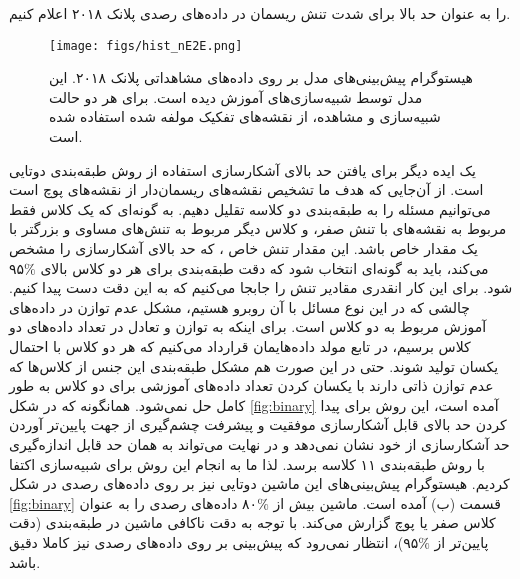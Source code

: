     را به عنوان حد بالا برای شدت تنش ریسمان در داده‌های رصدی پلانک ۲۰۱۸ اعلام کنیم.
\begin{figure}[ht!]
	\begin{center}
		\texttt{[image: figs/hist\_nE2E.png]}
	\end{center}
	\caption{
		هیستوگرام پیش‌بینی‌های مدل بر روی داده‌های مشاهداتی پلانک ۲۰۱۸. این مدل توسط  شبیه‌سازی‌های  آموزش دیده است. برای هر دو حالت شبیه‌سازی‌ و مشاهده، از نقشه‌های تفکیک مولفه شده  استفاده شده است.  
	}
	\label{fig:hist_nsye2e}
\end{figure} 

\par
		یک ایده دیگر برای یافتن حد بالای آشکارسازی استفاده از روش طبقه‌بندی دوتایی است. از آن‌جایی که هدف ما تشخیص  نقشه‌های ریسمان‌دار از نقشه‌های پوچ است می‌توانیم مسئله را به طبقه‌بندی دو کلاسه تقلیل دهیم. به گونه‌ای که یک کلاس فقط مربوط به نقشه‌های با تنش صفر، و کلاس دیگر مربوط به تنش‌های مساوی و بزرگتر با یک مقدار خاص باشد. این مقدار تنش خاص ، که حد بالای آشکارسازی را مشخص می‌کند، باید به گونه‌ای انتخاب شود که دقت طبقه‌بندی برای هر دو کلاس بالای $\%$۹۵ شود. برای این کار انقدری مقادیر تنش را جابجا می‌کنیم که به این دقت دست پیدا کنیم. چالشی که در این نوع مسائل با آن روبرو هستیم، مشکل عدم توازن در داده‌های آموزش مربوط به دو کلاس است. برای اینکه به توازن و تعادل در تعداد داده‌های دو کلاس برسیم، در تابع مولد داده‌هایمان قرارداد می‌کنیم که هر دو کلاس با احتمال یکسان تولید شوند. حتی در این صورت هم مشکل طبقه‌بندی این جنس از کلاس‌ها که عدم توازن ذاتی دارند با یکسان کردن تعداد داده‌های آموزشی برای دو کلاس به طور کامل حل نمی‌شود. همانگونه که در شکل 
\ref{fig:binary}
آمده است، این روش برای پیدا کردن حد بالای قابل آشکارسازی موفقیت و پیشرفت چشم‌گیری از جهت پایین‌تر آوردن حد آشکارسازی از خود نشان نمی‌دهد و در نهایت می‌تواند به همان حد قابل اندازه‌گیری با روش طبقه‌بندی ۱۱ کلاسه برسد. لذا ما به انجام این روش برای شبیه‌سازی 
اکتفا کردیم. هیستوگرام پیش‌بینی‌های این ماشین دوتایی نیز بر روی داده‌های رصدی در شکل
\ref{fig:binary} 	  
قسمت (ب) آمده است. ماشین بیش از $\%$۸۰ داده‌های رصدی را به عنوان کلاس صفر یا پوچ گزارش می‌کند. با توجه به دقت ناکافی ماشین در طبقه‌بندی (دقت پایین‌تر از $\%$۹۵)، انتظار نمی‌رود که پیش‌بینی بر روی داده‌های رصدی نیز کاملا دقیق باشد. ‌  
 
